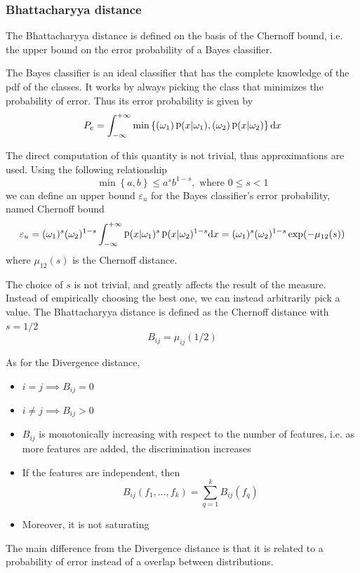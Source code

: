 \documentclass[oneside,onecolumn]{report}
\newcommand{\eps}{\varepsilon}
\DeclareMathOperator*{\pdf}{p}
\let\P\relax
\DeclareMathOperator*{\P}{P}
\begin{document}
\subsubsection{Bhattacharyya distance}

The Bhattacharyya distance is defined on the basis of the Chernoff bound, i.e. the upper bound on the error probability of a Bayes classifier.

The Bayes classifier is an ideal classifier that has the complete knowledge of the pdf of the classes.
It works by always picking the class that minimizes the probability of error.
Thus its error probability is given by
$$ P_e = \int_{-\infty}^{+\infty} \min \left\{ \P(\omega_1) \pdf(x | \omega_1), \P(\omega_2) \pdf(x | \omega_2) \right\} \dd x $$

The direct computation of this quantity is not trivial, thus approximations are used.
Using the following relationship
$$ \min \left\{ a, b \right\} \leq a^s b^{1 - s}, \text{ where } 0 \leq s < 1 $$
we can define an upper bound $\eps_u$ for the Bayes classifier's error probability, named Chernoff bound
$$ \eps_u = \P(\omega_1)^s \P(\omega_2)^{1 - s} \int_{-\infty}^{+\infty} \pdf(x | \omega_1)^s \pdf(x | \omega_2)^{1 - s} \dd x =  \P(\omega_1)^s \P(\omega_2)^{1 - s} \exp( -\mu_{12}(s)) $$
where $\mu_{12}(s)$ is the Chernoff distance.

The choice of $s$ is not trivial, and greatly affects the result of the measure.
Instead of empirically choosing the best one, we can instead arbitrarily pick a value.
The Bhattacharyya distance is defined as the Chernoff distance with $s = 1/2$
$$ B_{i j} = \mu_{i j}(1/2) $$

As for the Divergence distance,
\begin{itemize}
    \item $i = j \implies B_{i j} = 0$
    \item $i \neq j \implies B_{i j} > 0$
    \item $B_{i j}$ is monotonically increasing with respect to the number of features, i.e. as more features are added, the discrimination increases
    \item If the features are independent, then
    $$ B_{i j}(f_1, \dots, f_k) = \sum_{q = 1}^k B_{i j}(f_q) $$
    \item Moreover, it is not saturating
\end{itemize}

The main difference from the Divergence distance is that it is related to a probability of error instead of a overlap between distributions.
\end{document}
